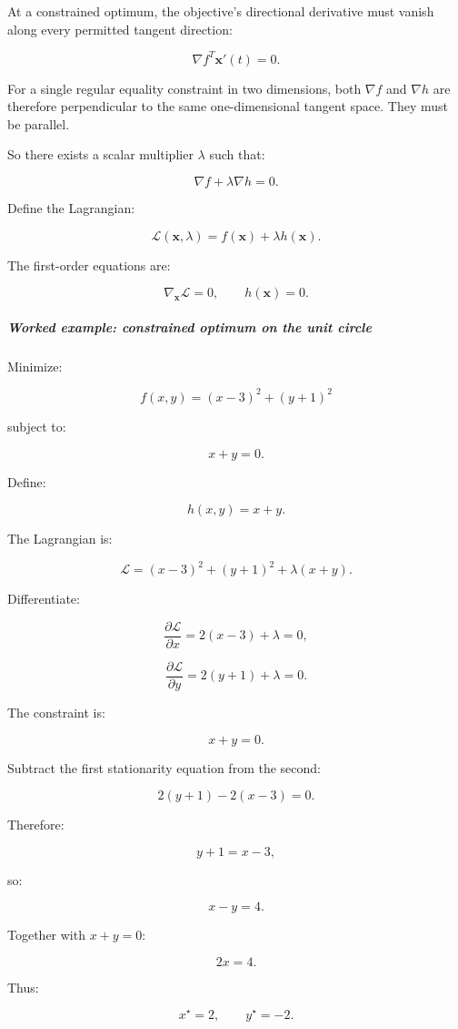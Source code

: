 At a constrained optimum, the objective's directional derivative must vanish along every permitted tangent direction:

\[
\nabla f^T\mathbf x'(t)=0.
\]

For a single regular equality constraint in two dimensions, both \(\nabla f\) and \(\nabla h\) are therefore perpendicular to the same one-dimensional tangent space. They must be parallel.

So there exists a scalar multiplier \(\lambda\) such that:

\[
\boxed{ \nabla f+\lambda\nabla h=0 }.
\]

Define the Lagrangian:

\[
\boxed{ \mathcal L(\mathbf x,\lambda) = f(\mathbf x)+\lambda h(\mathbf x) }.
\]

The first-order equations are:

\[
\nabla_{\mathbf x}\mathcal L=0, \qquad h(\mathbf x)=0.
\]

\subparagraph{Worked example: constrained optimum on the unit circle}\label{worked-example-constrained-optimum-on-the-unit-circle}

Minimize:

\[
f(x,y)=(x-3)^2+(y+1)^2
\]

subject to:

\[
x+y=0.
\]

Define:

\[
h(x,y)=x+y.
\]

The Lagrangian is:

\[
\mathcal L= (x-3)^2+(y+1)^2+\lambda(x+y).
\]

Differentiate:

\[
\frac{\partial\mathcal L}{\partial x} = 2(x-3)+\lambda=0,
\]

\[
\frac{\partial\mathcal L}{\partial y} = 2(y+1)+\lambda=0.
\]

The constraint is:

\[
x+y=0.
\]

Subtract the first stationarity equation from the second:

\[
2(y+1)-2(x-3)=0.
\]

Therefore:

\[
y+1=x-3,
\]

so:

\[
x-y=4.
\]

Together with \(x+y=0\):

\[
2x=4.
\]

Thus:

\[
\boxed{x^\star=2,\qquad y^\star=-2}.
\]


